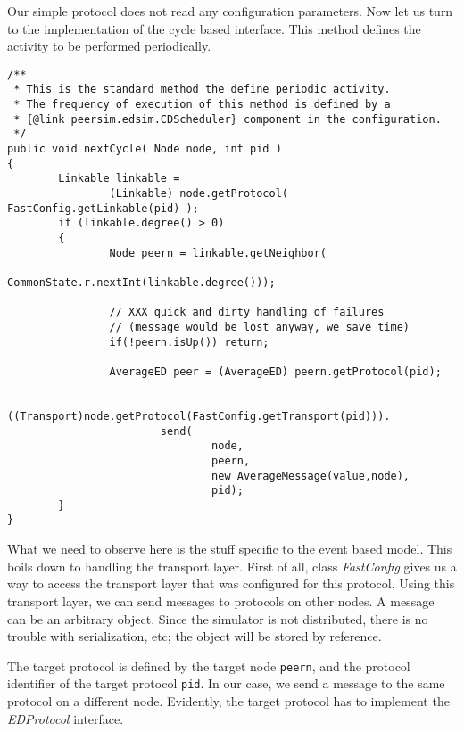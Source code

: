 \documentclass[a4paper,11pt]{article}
\begin{document}
Our simple protocol does not read any configuration parameters.
Now let us turn to the implementation of the cycle based interface.
This method defines the activity to be performed periodically.

\footnotesize
\begin{verbatim}
/**
 * This is the standard method the define periodic activity.
 * The frequency of execution of this method is defined by a
 * {@link peersim.edsim.CDScheduler} component in the configuration.
 */
public void nextCycle( Node node, int pid )
{
        Linkable linkable = 
                (Linkable) node.getProtocol( FastConfig.getLinkable(pid) );
        if (linkable.degree() > 0)
        {
                Node peern = linkable.getNeighbor(
                                CommonState.r.nextInt(linkable.degree()));
                
                // XXX quick and dirty handling of failures
                // (message would be lost anyway, we save time)
                if(!peern.isUp()) return;
                
                AverageED peer = (AverageED) peern.getProtocol(pid);
                
                ((Transport)node.getProtocol(FastConfig.getTransport(pid))).
                        send(
                                node,
                                peern,
                                new AverageMessage(value,node),
                                pid);
        }
}
\end{verbatim}
\normalsize

What we need to observe here is the stuff specific to the event based
model.
This boils down to handling the transport layer.
First of all, class \emph{FastConfig} gives us a way to access the transport
layer that was configured for this protocol.
Using this transport layer, we can send messages to protocols on other nodes.
A message can be an arbitrary object.
Since the simulator is not distributed, there is no trouble with
serialization, etc; the object will be stored by reference.

The target protocol is defined by the target node \texttt{peern}, and
the protocol identifier of the target protocol \texttt{pid}.
In our case, we send a message to the same protocol on a different node.
Evidently, the target protocol has to implement the \emph{EDProtocol}
interface.
\end{document}
